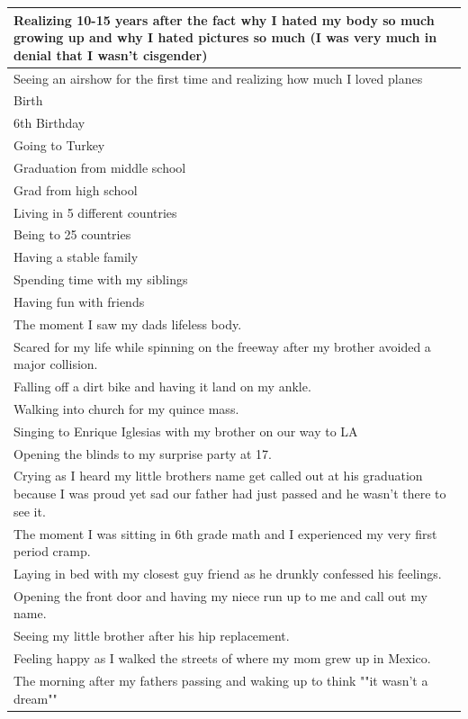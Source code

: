 \documentclass[
  .7em,
  letterpaper,
  DIV=11,
  numbers=noendperiod]{scrartcl}
\begin{document}
\begin{table}
\begin{tabular}{l}
\hline
Realizing 10-15 years after the fact why I hated my body so much growing up and why I hated pictures so much (I was very much in denial that I wasn't cisgender)\\
\hline
Seeing an airshow for the first time and realizing how much I loved planes\\
\hline
Birth\\
\hline
6th Birthday\\
\hline
Going to Turkey\\
\hline
Graduation from middle school\\
\hline
Grad from high school\\
\hline
Living in 5 different countries\\
\hline
Being to 25 countries\\
\hline
Having a stable family\\
\hline
Spending time with my siblings\\
\hline
Having fun with friends\\
\hline
The moment I saw my dads lifeless body.\\
\hline
Scared for my life while spinning on the freeway after my brother avoided a major collision.\\
\hline
Falling off a dirt bike and having it land on my ankle.\\
\hline
Walking into church for my quince mass.\\
\hline
Singing to Enrique Iglesias with my brother on our way to LA\\
\hline
Opening the blinds to my surprise party at 17.\\
\hline
Crying as I heard my little brothers name get called out at his graduation because I was proud yet sad our father had just passed and he wasn't there to see it.\\
\hline
The moment I was sitting in 6th grade math and I experienced my very first period cramp.\\
\hline
Laying in bed with my closest guy friend as he drunkly confessed his feelings.\\
\hline
Opening the front door and having my niece run up to me and call out my name.\\
\hline
Seeing my little brother after his hip replacement.\\
\hline
Feeling happy as I walked the streets of where my mom grew up in Mexico.\\
\hline
The morning after my fathers passing and waking up to think ""it wasn't a dream""\\

\end{tabular}
\end{table}
\end{document}
